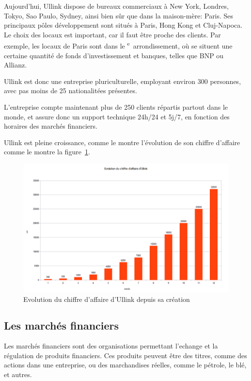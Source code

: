 \documentclass[a4paper, 12pt]{article}
\begin{document}
Aujourd'hui, Ullink dispose de bureaux commerciaux à New York, Londres, Tokyo, Sao Paulo, Sydney, ainsi bien sûr que dans la maison-mère: Paris. Ses principaux pôles développement sont situés à Paris, Hong Kong et Cluj-Napoca. Le choix des locaux est important, car il faut être proche des clients. Par exemple, les locaux de Paris sont dans le \textsc{}\textsuperscript{e}~arrondissement, où se situent une certaine quantité de fonds d'investissement et banques, telles que BNP ou Allianz.

Ullink est donc une entreprise pluriculturelle, employant environ 300 personnes, avec pas moins de 25 nationalitées présentes.

L'entreprise compte maintenant plus de 250 clients répartis partout dans le monde, et assure donc un support technique 24h/24 et 5j/7, en fonction des horaires des marchés financiers.

Ullink est pleine croissance, comme le montre l'évolution de son chiffre d'affaire comme le montre la figure~\ref{ca_ullink}.

\begin{figure}
\includegraphics[width=\textwidth]{ca_ullink.png}
\caption{Evolution du chiffre d'affaire d'Ullink depuis sa création}
\label{ca_ullink}
\end{figure}

\subsection{Les marchés financiers}

Les marchés financiers sont des organisations permettant l'echange et la régulation de produits financiers. Ces produits peuvent être des titres, comme des actions dans une entreprise, ou des marchandises réelles, comme le pétrole, le blé, et autres.
\end{document}
